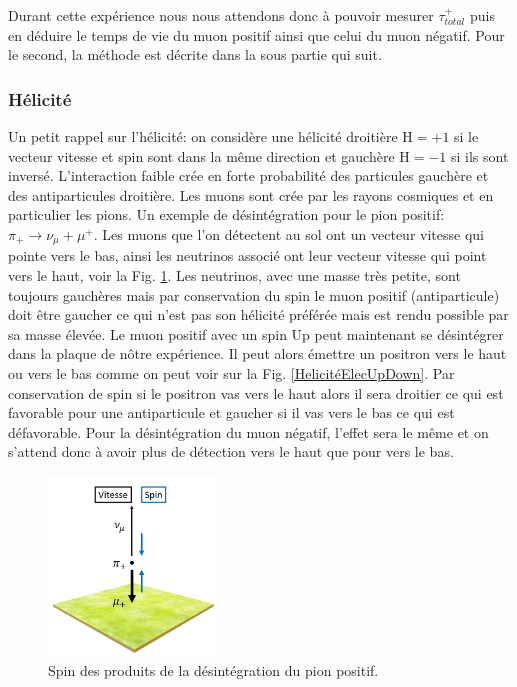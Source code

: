 \documentclass[12pt]{article}
\begin{document}
Durant cette expérience nous nous attendons donc à pouvoir mesurer $\tau_{total}^{+}$  puis en déduire le temps de vie du muon positif ainsi que celui du muon négatif. Pour le second, la méthode est décrite dans la sous partie qui suit.

\newpage

\subsubsection{Hélicité}

Un petit rappel sur l'hélicité: on considère une hélicité droitière H$=+1$ si le vecteur vitesse et spin sont dans la même direction et gauchère H$=-1$ si ils sont inversé. L'interaction faible crée en forte probabilité des particules gauchère et des antiparticules droitière. Les muons sont crée par les rayons cosmiques et en particulier les pions. Un exemple de désintégration pour le pion positif: $\pi_{+}\rightarrow\nu_{\mu}+\mu^{+}$. Les muons que l'on détectent au sol ont un vecteur vitesse qui pointe vers le bas, ainsi les neutrinos associé ont leur vecteur vitesse qui point vers le haut, voir la Fig. \ref{fig:Helicite}. Les neutrinos, avec une masse très petite, sont toujours gauchères mais par conservation du spin le muon positif (antiparticule) doit être gaucher ce qui n'est pas son hélicité préférée mais est rendu possible par sa masse élevée. Le muon positif avec un spin Up peut maintenant se désintégrer dans la plaque de nôtre expérience. Il peut alors émettre un positron vers le haut ou vers le bas comme on peut voir sur la Fig. \ref{HelicitéElecUpDown}. Par conservation de spin si le positron vas vers le haut alors il sera droitier ce qui est favorable pour une antiparticule et gaucher si il vas vers le bas ce qui est défavorable. Pour la désintégration du muon négatif, l'effet sera le même et on s'attend donc à avoir plus de détection vers le haut que pour vers le bas.



\begin{figure}[htpb!]
    \centering
    \includegraphics[width=0.4\textwidth]{Images/Photos/Helicite.jpg}
    \caption{Spin des produits de la désintégration du pion positif.}
    \label{fig:Helicite}
\end{figure}
\end{document}
